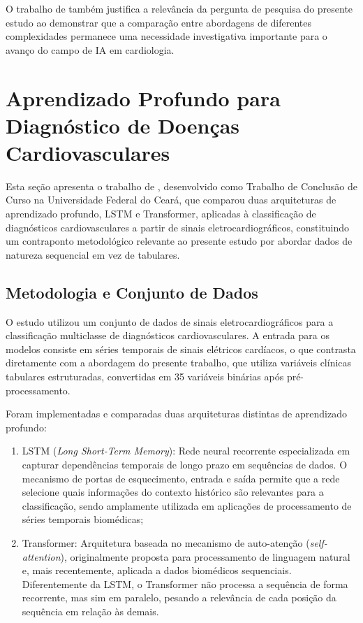 O trabalho de  tamb\'em justifica a relev\^ancia da pergunta de pesquisa do presente estudo ao demonstrar que a compara\c c\~ao entre abordagens de diferentes complexidades permanece uma necessidade investigativa importante para o avan\c co do campo de IA em cardiologia.


\section{Aprendizado Profundo para Diagn\'ostico de Doen\c cas Cardiovasculares}

Esta se\c c\~ao apresenta o trabalho de , desenvolvido como Trabalho de Conclus\~ao de Curso na Universidade Federal do Cear\'a, que comparou duas arquiteturas de aprendizado profundo, LSTM e Transformer, aplicadas \`a classifica\c c\~ao de diagn\'osticos cardiovasculares a partir de sinais eletrocardiogr\'aficos, constituindo um contraponto metodol\'ogico relevante ao presente estudo por abordar dados de natureza sequencial em vez de tabulares.

\subsection{Metodologia e Conjunto de Dados}

O estudo utilizou um conjunto de dados de sinais eletrocardiogr\'aficos para a classifica\c c\~ao multiclasse de diagn\'osticos cardiovasculares. A entrada para os modelos consiste em s\'eries temporais de sinais el\'etricos card\'iacos, o que contrasta diretamente com a abordagem do presente trabalho, que utiliza vari\'aveis cl\'inicas tabulares estruturadas, convertidas em 35 vari\'aveis bin\'arias ap\'os pr\'e-processamento.

Foram implementadas e comparadas duas arquiteturas distintas de aprendizado profundo:

\begin{enumerate}
  \item LSTM (\textit{Long Short-Term Memory}): Rede neural recorrente especializada em capturar depend\^encias temporais de longo prazo em sequ\^encias de dados. O mecanismo de portas de esquecimento, entrada e sa\'ida permite que a rede selecione quais informa\c c\~oes do contexto hist\'orico s\~ao relevantes para a classifica\c c\~ao, sendo amplamente utilizada em aplica\c c\~oes de processamento de s\'eries temporais biom\'edicas;
  \item Transformer: Arquitetura baseada no mecanismo de auto-aten\c c\~ao (\textit{self-attention}), originalmente proposta para processamento de linguagem natural e, mais recentemente, aplicada a dados biom\'edicos sequenciais. Diferentemente da LSTM, o Transformer n\~ao processa a sequ\^encia de forma recorrente, mas sim em paralelo, pesando a relev\^ancia de cada posi\c c\~ao da sequ\^encia em rela\c c\~ao \`as demais.
\end{enumerate}


